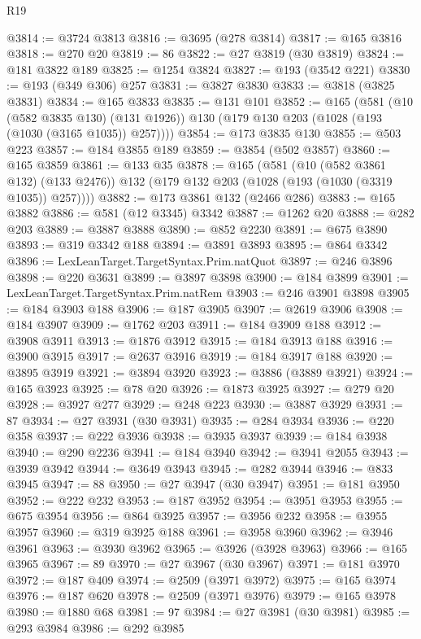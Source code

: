 \begin{lexlean}{R19}
\begin{coremodule}
@3814 := @3724 @3813
@3816 := @3695 (@278 @3814)
@3817 := @165 @3816
@3818 := @270 @20
@3819 := 86
@3822 := @27 @3819 (@30 @3819)
@3824 := @181 @3822 @189
@3825 := @1254 @3824
@3827 := @193 (@3542 @221)
@3830 := @193 (@349 @306) @257
@3831 := @3827 @3830
@3833 := @3818 (@3825 @3831)
@3834 := @165 @3833
@3835 := @131 @101
@3852 := @165
    (@581
      (@10 (@582 @3835 @130) (@131 @1926))
      @130
      (@179 @130 @203 (@1028 (@193 (@1030 (@3165 @1035)) @257))))
@3854 := @173 @3835 @130
@3855 := @503 @223
@3857 := @184 @3855 @189
@3859 := @3854 (@502 @3857)
@3860 := @165 @3859
@3861 := @133 @35
@3878 := @165
    (@581
      (@10 (@582 @3861 @132) (@133 @2476))
      @132
      (@179 @132 @203 (@1028 (@193 (@1030 (@3319 @1035)) @257))))
@3882 := @173 @3861 @132 (@2466 @286)
@3883 := @165 @3882
@3886 := @581 (@12 @3345) @3342
@3887 := @1262 @20
@3888 := @282 @203
@3889 := @3887 @3888
@3890 := @852 @2230
@3891 := @675 @3890
@3893 := @319 @3342 @188
@3894 := @3891 @3893
@3895 := @864 @3342
@3896 := LexLeanTarget.TargetSyntax.Prim.natQuot
@3897 := @246 @3896
@3898 := @220 @3631
@3899 := @3897 @3898
@3900 := @184 @3899
@3901 := LexLeanTarget.TargetSyntax.Prim.natRem
@3903 := @246 @3901 @3898
@3905 := @184 @3903 @188
@3906 := @187 @3905
@3907 := @2619 @3906
@3908 := @184 @3907
@3909 := @1762 @203
@3911 := @184 @3909 @188
@3912 := @3908 @3911
@3913 := @1876 @3912
@3915 := @184 @3913 @188
@3916 := @3900 @3915
@3917 := @2637 @3916
@3919 := @184 @3917 @188
@3920 := @3895 @3919
@3921 := @3894 @3920
@3923 := @3886 (@3889 @3921)
@3924 := @165 @3923
@3925 := @78 @20
@3926 := @1873 @3925
@3927 := @279 @20
@3928 := @3927 @277
@3929 := @248 @223
@3930 := @3887 @3929
@3931 := 87
@3934 := @27 @3931 (@30 @3931)
@3935 := @284 @3934
@3936 := @220 @358
@3937 := @222 @3936
@3938 := @3935 @3937
@3939 := @184 @3938
@3940 := @290 @2236
@3941 := @184 @3940
@3942 := @3941 @2055
@3943 := @3939 @3942
@3944 := @3649 @3943
@3945 := @282 @3944
@3946 := @833 @3945
@3947 := 88
@3950 := @27 @3947 (@30 @3947)
@3951 := @181 @3950
@3952 := @222 @232
@3953 := @187 @3952
@3954 := @3951 @3953
@3955 := @675 @3954
@3956 := @864 @3925
@3957 := @3956 @232
@3958 := @3955 @3957
@3960 := @319 @3925 @188
@3961 := @3958 @3960
@3962 := @3946 @3961
@3963 := @3930 @3962
@3965 := @3926 (@3928 @3963)
@3966 := @165 @3965
@3967 := 89
@3970 := @27 @3967 (@30 @3967)
@3971 := @181 @3970
@3972 := @187 @409
@3974 := @2509 (@3971 @3972)
@3975 := @165 @3974
@3976 := @187 @620
@3978 := @2509 (@3971 @3976)
@3979 := @165 @3978
@3980 := @1880 @68
@3981 := 97
@3984 := @27 @3981 (@30 @3981)
@3985 := @293 @3984
@3986 := @292 @3985

\end{coremodule}
\end{lexlean}
